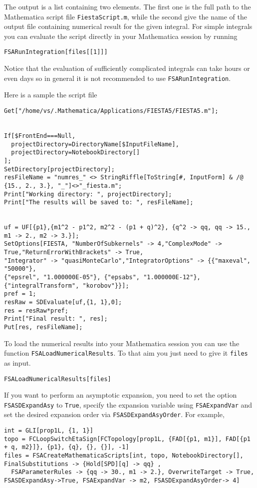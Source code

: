 \documentclass[../FeynHelpersManual.tex]{subfiles}
\begin{document}
The output is a list containing two elements. The first one is the full
path to the Mathematica script file \texttt{FiestaScript.m}, while the
second give the name of the output file containing numerical result for
the given integral. For simple integrals you can evaluate the script
directly in your Mathematica session by running

\begin{verbatim}
FSARunIntegration[files[[1]]]
\end{verbatim}

Notice that the evaluation of sufficiently complicated integrals can
take hours or even days so in general it is not recommended to use
\texttt{FSARunIntegration}.

Here is a sample the script file

\begin{verbatim}
Get["/home/vs/.Mathematica/Applications/FIESTA5/FIESTA5.m"];


If[$FrontEnd===Null,
  projectDirectory=DirectoryName[$InputFileName],
  projectDirectory=NotebookDirectory[]
];
SetDirectory[projectDirectory];
resFileName = "numres_" <> StringRiffle[ToString[#, InputForm] & /@ {15., 2., 3.}, "_"]<>"_fiesta.m";
Print["Working directory: ", projectDirectory];
Print["The results will be saved to: ", resFileName];


uf = UF[{p1},{m1^2 - p1^2, m2^2 - (p1 + q)^2}, {q^2 -> qq, qq -> 15., m1 -> 2., m2 -> 3.}];
SetOptions[FIESTA, "NumberOfSubkernels" -> 4,"ComplexMode" -> True,"ReturnErrorWithBrackets" -> True,
"Integrator" -> "quasiMonteCarlo","IntegratorOptions" -> {{"maxeval", "50000"}, 
{"epsrel", "1.000000E-05"}, {"epsabs", "1.000000E-12"}, {"integralTransform", "korobov"}}];
pref = 1;
resRaw = SDEvaluate[uf,{1, 1},0];
res = resRaw*pref;
Print["Final result: ", res];
Put[res, resFileName];
\end{verbatim}

To load the numerical results into your Mathematica session you can use
the function \texttt{FSALoadNumericalResults}. To that aim you just need
to give it \texttt{files} as input.

\begin{verbatim}
FSALoadNumericalResults[files]
\end{verbatim}

If you want to perform an asymptotic expansion, you need to set the
option \texttt{FSASDExpandAsy} to \texttt{True}, specify the expansion
variable using \texttt{FSAExpandVar} and set the desired expansion order
via \texttt{FSASDExpandAsyOrder}. For example,

\begin{verbatim}
int = GLI[prop1L, {1, 1}]
topo = FCLoopSwitchEtaSign[FCTopology[prop1L, {FAD[{p1, m1}], FAD[{p1 + q, m2}]}, {p1}, {q}, {}, {}], -1]
files = FSACreateMathematicaScripts[int, topo, NotebookDirectory[], FinalSubstitutions -> {Hold[SPD][q] -> qq} , 
  FSAParameterRules -> {qq -> 30., m1 -> 2.}, OverwriteTarget -> True, FSASDExpandAsy->True, FSAExpandVar -> m2, FSASDExpandAsyOrder-> 4]
\end{verbatim}
\end{document}
